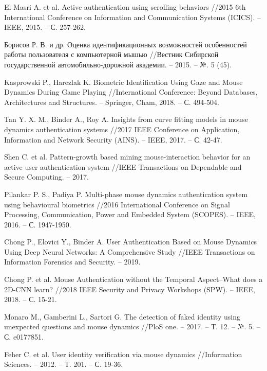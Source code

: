 \documentclass[12pt]{article}
\begin{document}
\begin{thebibliography}{20}
        El Masri A. et al. Active authentication using scrolling behaviors //2015 6th International Conference on Information and Communication Systems (ICICS). – IEEE, 2015. – С. 257-262.

        Борисов Р. В. и др. Оценка идентификационных возможностей особенностей работы пользователя с компьютерной мышью //Вестник Сибирской государственной автомобильно-дорожной академии. – 2015. – №. 5 (45).

        Kasprowski P., Harezlak K. Biometric Identification Using Gaze and Mouse Dynamics During Game Playing //International Conference: Beyond Databases, Architectures and Structures. – Springer, Cham, 2018. – С. 494-504.

        Tan Y. X. M., Binder A., Roy A. Insights from curve fitting models in mouse dynamics authentication systems //2017 IEEE Conference on Application, Information and Network Security (AINS). – IEEE, 2017. – С. 42-47.

        Shen C. et al. Pattern-growth based mining mouse-interaction behavior for an active user authentication system //IEEE Transactions on Dependable and Secure Computing. – 2017.

        Pilankar P. S., Padiya P. Multi-phase mouse dynamics authentication system using behavioural biometrics //2016 International Conference on Signal Processing, Communication, Power and Embedded System (SCOPES). – IEEE, 2016. – С. 1947-1950.

        Chong P., Elovici Y., Binder A. User Authentication Based on Mouse Dynamics Using Deep Neural Networks: A Comprehensive Study //IEEE Transactions on Information Forensics and Security. – 2019.

        Chong P. et al. Mouse Authentication without the Temporal Aspect–What does a 2D-CNN learn? //2018 IEEE Security and Privacy Workshops (SPW). – IEEE, 2018. – С. 15-21.
        
        Monaro M., Gamberini L., Sartori G. The detection of faked identity using unexpected questions and mouse dynamics //PloS one. – 2017. – Т. 12. – №. 5. – С. e0177851.

        Feher C. et al. User identity verification via mouse dynamics //Information Sciences. – 2012. – Т. 201. – С. 19-36.


\end{thebibliography}
\end{document}
